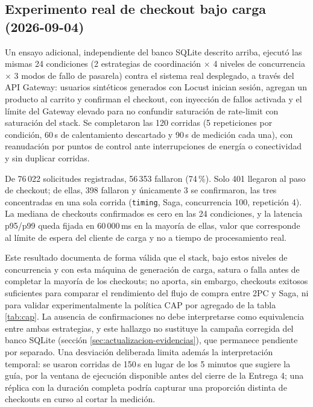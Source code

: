 \documentclass[12pt,a4paper]{article}
\begin{document}
\subsection{Experimento real de checkout bajo carga (2026-09-04)}\label{sec:experimento-real-checkout}
Un ensayo adicional, independiente del banco SQLite descrito arriba, ejecutó las mismas 24 condiciones (2 estrategias de coordinación $\times$ 4 niveles de concurrencia $\times$ 3 modos de fallo de pasarela) contra el sistema real desplegado, a través del API Gateway: usuarios sintéticos generados con Locust inician sesión, agregan un producto al carrito y confirman el checkout, con inyección de fallos activada y el límite del Gateway elevado para no confundir saturación de rate-limit con saturación del stack. Se completaron las 120 corridas (5 repeticiones por condición, 60\,s de calentamiento descartado y 90\,s de medición cada una), con reanudación por puntos de control ante interrupciones de energía o conectividad y sin duplicar corridas.

De 76\,022 solicitudes registradas, 56\,353 fallaron (74\,\%). Solo 401 llegaron al paso de checkout; de ellas, 398 fallaron y únicamente 3 se confirmaron, las tres concentradas en una sola corrida (\texttt{timing}, Saga, concurrencia 100, repetición 4). La mediana de checkouts confirmados es cero en las 24 condiciones, y la latencia p95/p99 queda fijada en 60\,000\,ms en la mayoría de ellas, valor que corresponde al límite de espera del cliente de carga y no a tiempo de procesamiento real.

Este resultado documenta de forma válida que el stack, bajo estos niveles de concurrencia y con esta máquina de generación de carga, satura o falla antes de completar la mayoría de los checkouts; no aporta, sin embargo, checkouts exitosos suficientes para comparar el rendimiento del flujo de compra entre 2PC y Saga, ni para validar experimentalmente la política CAP por agregado de la tabla \ref{tab:cap}. La ausencia de confirmaciones no debe interpretarse como equivalencia entre ambas estrategias, y este hallazgo no sustituye la campaña corregida del banco SQLite (sección \ref{sec:actualizacion-evidencias}), que permanece pendiente por separado. Una desviación deliberada limita además la interpretación temporal: se usaron corridas de 150\,s en lugar de los 5 minutos que sugiere la guía, por la ventana de ejecución disponible antes del cierre de la Entrega 4; una réplica con la duración completa podría capturar una proporción distinta de checkouts en curso al cortar la medición.
\end{document}
